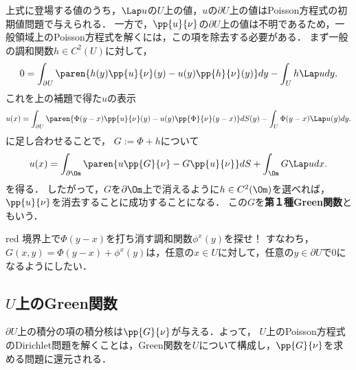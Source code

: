 \documentclass[uplatex,dvipdfmx]{jsreport}
\begin{document}
\begin{observation}[調和関数の和として解作用素を得る]
    上式に登場する値のうち，$\Lap u$の$U$上の値，$u$の$\partial U$上の値はPoisson方程式の初期値問題で与えられる．
    一方で，$\pp{u}{\nu}$の$\partial U$上の値は不明であるため，一般領域上のPoisson方程式を解くには，この項を除去する必要がある．
    まず一般の調和関数$h\in C^2(U)$に対して，
    \[0=\int_{\partial U}\paren{h(y)\pp{u}{\nu}(y)-u(y)\pp{h}{\nu}(y)}dy-\int_Uh\Lap udy.\]
    これを上の補題で得た$u$の表示
    \[u(x)=\int_{\partial U}\paren{\Phi(y-x)\pp{u}{\nu}(y)-u(y)\pp{\Phi}{\nu}(y-x)}dS(y)-\int_U\Phi(y-x)\Lap u(y)dy.\]
    に足し合わせることで，
    $G:=\Phi+h$について
    \[u(x)=\int_{\partial\Om}\paren{u\pp{G}{\nu}-G\pp{u}{\nu}}dS+\int_\Om G\Lap udx.\]
    を得る．
    したがって，$G$を$\partial\Om$上で消えるように$h\in C^2(\Om)$を選べれば，$\pp{u}{\nu}$を消去することに成功することになる．
    この$G$を\textbf{第１種Green関数}ともいう．
\end{observation}

\begin{tbox}{red}{}
    境界上で$\Phi(y-x)$を打ち消す調和関数$\phi^x(y)$を探せ！
    すなわち，$G(x,y)=\Phi(y-x)+\phi^x(y)$は，任意の$x\in U$に対して，任意の$y\in\partial U$で$0$になるようにしたい．
\end{tbox}

\subsection{$U$上のGreen関数}

\begin{tcolorbox}[colframe=ForestGreen, colback=ForestGreen!10!white,breakable,colbacktitle=ForestGreen!40!white,coltitle=black,fonttitle=\bfseries\sffamily,
title=]
    $\partial U$上の積分の項の積分核は$\pp{G}{\nu}$が与える．よって，
    $U$上のPoisson方程式のDirichlet問題を解くことは，Green関数を$U$について構成し，$\pp{G}{\nu}$を求める問題に還元される．
\end{tcolorbox}
\end{document}
